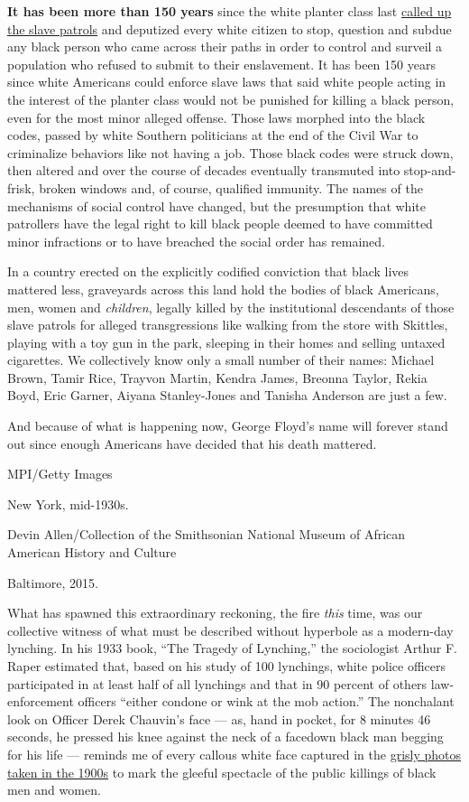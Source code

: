 \textbf{It has been more than 150 years} since the white planter class
last
\href{https://lawenforcementmuseum.org/2019/07/10/slave-patrols-an-early-form-of-american-policing/}{called
up the slave patrols} and deputized every white citizen to stop,
question and subdue any black person who came across their paths in
order to control and surveil a population who refused to submit to their
enslavement. It has been 150 years since white Americans could enforce
slave laws that said white people acting in the interest of the planter
class would not be punished for killing a black person, even for the
most minor alleged offense. Those laws morphed into the black codes,
passed by white Southern politicians at the end of the Civil War to
criminalize behaviors like not having a job. Those black codes were
struck down, then altered and over the course of decades eventually
transmuted into stop-and-frisk, broken windows and, of course, qualified
immunity. The names of the mechanisms of social control have changed,
but the presumption that white patrollers have the legal right to kill
black people deemed to have committed minor infractions or to have
breached the social order has remained.

In a country erected on the explicitly codified conviction that black
lives mattered less, graveyards across this land hold the bodies of
black Americans, men, women and \emph{children}, legally killed by the
institutional descendants of those slave patrols for alleged
transgressions like walking from the store with Skittles, playing with a
toy gun in the park, sleeping in their homes and selling untaxed
cigarettes. We collectively know only a small number of their names:
Michael Brown, Tamir Rice, Trayvon Martin, Kendra James, Breonna Taylor,
Rekia Boyd, Eric Garner, Aiyana Stanley-Jones and Tanisha Anderson are
just a few.

And because of what is happening now, George Floyd's name will forever
stand out since enough Americans have decided that his death mattered.

MPI/Getty Images

New York, mid-1930s.

Devin Allen/Collection of the Smithsonian National Museum of African
American History and Culture

Baltimore, 2015.

What has spawned this extraordinary reckoning, the fire \emph{this}
time, was our collective witness of what must be described without
hyperbole as a modern-day lynching. In his 1933 book, ``The Tragedy of
Lynching,'' the sociologist Arthur F. Raper estimated that, based on his
study of 100 lynchings, white police officers participated in at least
half of all lynchings and that in 90 percent of others law-enforcement
officers ``either condone or wink at the mob action.'' The nonchalant
look on Officer Derek Chauvin's face --- as, hand in pocket, for 8
minutes 46 seconds, he pressed his knee against the neck of a facedown
black man begging for his life --- reminds me of every callous white
face captured in the \href{https://www.withoutsanctuary.org/}{grisly
photos taken in the 1900s} to mark the gleeful spectacle of the public
killings of black men and women.

